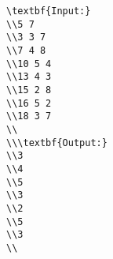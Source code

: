 \begin{verbatim}
\textbf{Input:}
\\5 7
\\3 3 7
\\7 4 8
\\10 5 4
\\13 4 3
\\15 2 8
\\16 5 2
\\18 3 7
\\
\\\textbf{Output:}
\\3
\\4
\\5
\\3
\\2
\\5
\\3
\\\end{verbatim}